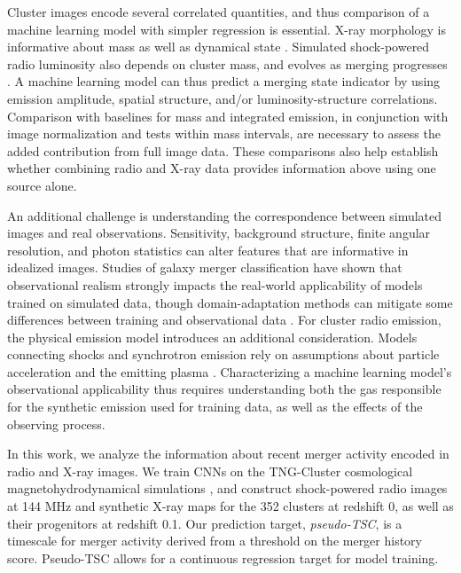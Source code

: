 Cluster images encode several correlated quantities, and thus comparison of a machine learning model with simpler regression is essential.
X-ray morphology is informative about mass as well as dynamical state \citep{Green2019}.
Simulated shock-powered radio luminosity also depends on cluster mass, and evolves as merging progresses \citep{Nuza2024}.
A machine learning model can thus predict a merging state indicator by using emission amplitude, spatial structure, and/or luminosity-structure correlations.
Comparison with baselines for mass and integrated emission, in conjunction with image normalization and tests within mass intervals, are necessary to assess the added contribution from full image data.
These comparisons also help establish whether combining radio and X-ray data provides information above using one source alone.

An additional challenge is understanding the correspondence between simulated images and real observations.
Sensitivity, background structure, finite angular resolution, and photon statistics can alter features that are informative in idealized images.
Studies of galaxy merger classification have shown that observational realism strongly impacts the real-world applicability of models trained on simulated data, though domain-adaptation methods can mitigate some differences between training and observational data \citep{Bottrell2019, Ciprijanovic2021}.
For cluster radio emission, the physical emission model introduces an additional consideration.
Models connecting shocks and synchrotron emission rely on assumptions about particle acceleration and the emitting plasma \citep{HoeftBruggen2007}.
Characterizing a machine learning model's observational applicability thus requires understanding both the gas responsible for the synthetic emission used for training data, as well as the effects of the observing process.

In this work, we analyze the information about recent merger activity encoded in radio and X-ray images.
We train CNNs on the TNG-Cluster cosmological magnetohydrodynamical simulations \citep{Nelson2024,Nelson2019}, and construct shock-powered radio images at 144 MHz and synthetic X-ray maps for the 352 clusters at redshift 0, as well as their progenitors at redshift 0.1.
Our prediction target, \emph{pseudo-TSC}, is a timescale for merger activity derived from a threshold on the merger history score.
Pseudo-TSC allows for a continuous regression target for model training.


